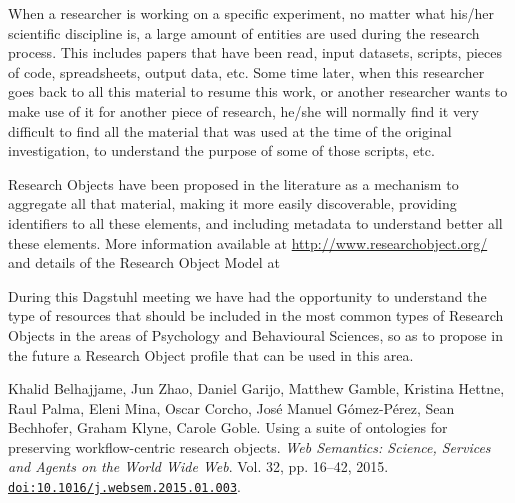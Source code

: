 \documentclass[a4paper,USenglish]{dagrep}
\begin{document}
{}
\license
When a researcher is working on a specific experiment, no matter what his/her scientific 
discipline is, a large amount of entities are used during the research process. This includes 
papers that have been read, input datasets, scripts, pieces of code, spreadsheets, output data, 
etc. Some time later, when this researcher goes back to all this material to resume this work, 
or another researcher wants to make use of it for another piece of research, he/she will 
normally find it very difficult to find all the material that was used at the time of the original 
investigation, to understand the purpose of some of those scripts, etc.

Research Objects have been proposed in the literature as a mechanism to aggregate all that 
material, making it more easily discoverable, providing identifiers to all these elements, and 
including metadata to understand better all these elements. More information available at 
\url{http://www.researchobject.org/} and details of the Research Object Model at 
\cite{Belhajjame201516}

During this Dagstuhl meeting we have had the opportunity to understand the type of 
resources that should be included in the most common types of Research Objects in the areas 
of Psychology and Behavioural Sciences, so as to propose in the future a Research Object 
profile that can be used in this area.

\begin{thebibliography}{0}
Khalid Belhajjame, Jun Zhao, Daniel Garijo, Matthew Gamble, 
Kristina Hettne, Raul Palma, Eleni Mina, Oscar Corcho, Jos{\'e} Manuel 
G{\'o}mez-P{\'e}rez, Sean Bechhofer, Graham Klyne, Carole Goble. Using a suite of ontologies for preserving workflow-centric research objects.  \textit{Web Semantics: Science, Services and Agents on the World Wide Web}.  Vol. 32, pp. 16–42, 2015.  \href{http://dx.doi.org/10.1016/j.websem.2015.01.003}{\nolinkurl{doi:10.1016/j.websem.2015.01.003}}.
\end{thebibliography}
\end{document}
